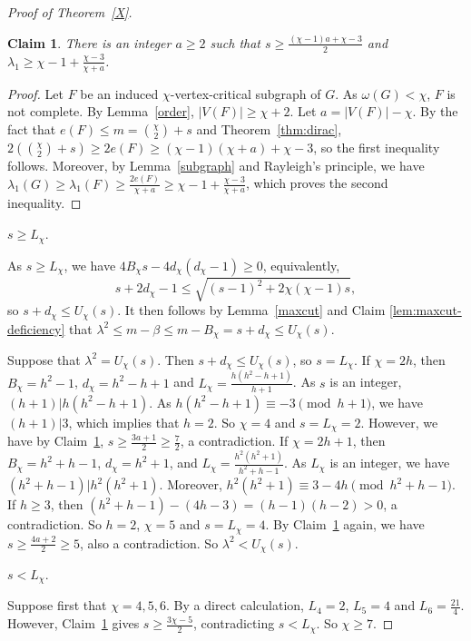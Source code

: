 \documentclass[12pt]{article}
\newtheorem{claim}{Claim}[section]
\begin{document}
\begin{proof}[Proof of Theorem~\ref{X}]
\begin{claim}\label{lem:critical-estimates}
There is an integer $a\ge2$ such that $s\ge\frac{(\chi-1)a+\chi-3}{2}$ and $\lambda_1\ge \chi-1+\frac{\chi-3}{\chi+a}$.
\end{claim}

\begin{proof}
Let $F$ be an induced $\chi$-vertex-critical subgraph of $G$. As $\omega(G)<\chi$, $F$ is not complete. By Lemma~\ref{order}, $|V(F)|\ge \chi+2$. Let $a=|V(F)|-\chi$. By  the fact that $e(F)\le m=\binom \chi2+s$ and Theorem~\ref{thm:dirac}, $2(\binom \chi2+s)\ge 2e(F)\ge(\chi-1)(\chi+a)+\chi-3$, so the first inequality follows. 
Moreover, by Lemma~\ref{subgraph} and Rayleigh's principle, we have
$\lambda_1(G)\ge\lambda_1(F)\ge\frac{2e(F)}{\chi+a}\ge \chi-1+\frac{\chi-3}{\chi+a}$,
which proves the second inequality.
\end{proof}

 $s\ge L_\chi$.


As $s\ge L_\chi$, we have $4B_\chi s-4d_\chi(d_\chi-1)\ge 0$, equivalently, 
\[
s+2d_\chi-1\le\sqrt{(s-1)^2+2\chi(\chi-1)s},
\] 
so $s+d_\chi\le U_\chi(s)$. It then follows by Lemma~\ref{maxcut} and Claim \ref{lem:maxcut-deficiency} that 
$\lambda^2\le m-\beta\le m-B_\chi=s+d_\chi\le U_\chi(s)$.

Suppose that $\lambda^2 = U_\chi(s)$. 
Then $s+d_\chi\le U_\chi(s)$, so  $s=L_\chi$.
If $\chi=2h$, then $B_\chi=h^2-1$, $d_\chi=h^2-h+1$ and $L_\chi=\frac{h(h^2-h+1)}{h+1}$. As $s$ is an integer,  $(h+1)|h(h^2-h+1)$. As $h(h^2-h+1)\equiv -3\pmod {h+1}$, we have $(h+1)|3$, which implies that $h=2$. So $\chi=4$ and $s=L_\chi=2$. However, we have by Claim~\ref{lem:critical-estimates}, $s\ge \frac{3a+1}{2}\ge \frac{7}{2}$, a contradiction. 
If $\chi=2h+1$, then 
$B_\chi=h^2+h-1$, $d_\chi=h^2+1$, and $L_\chi=\frac{h^2(h^2+1)}{h^2+h-1}$.
As $L_\chi$ is an integer, we have $(h^2+h-1)|h^2(h^2+1)$. Moreover, 
$h^2(h^2+1)\equiv3-4h\pmod{h^2+h-1}$. If $h\ge 3$, then
$(h^2+h-1)-(4h-3)=(h-1)(h-2)>0$, a contradiction. So $h=2$, $\chi=5$ and $s=L_\chi=4$.
By Claim~\ref{lem:critical-estimates} again, we have $s\ge \frac{4a+2}{2}\ge 5$, also a contradiction. So $\lambda^2< U_\chi(s)$.


 $s< L_\chi$.



Suppose first that $\chi=4,5,6$. By a direct calculation, $L_4=2$, $L_5=4$ and $L_6=\frac{21}{4}$. However, Claim~\ref{lem:critical-estimates} gives $s\ge \frac{3\chi-5}{2}$, contradicting $s<L_\chi$. So $\chi\ge 7$.


\end{proof}
\end{document}
